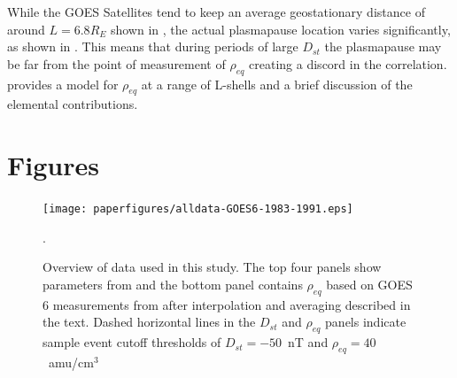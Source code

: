 \documentclass[10pt,twocolumn]{article}
\begin{document}
While the GOES Satellites tend to keep an average geostationary distance of around $L=6.8R_E$ shown in \cite{Takahashi2010}, the actual plasmapause location varies significantly, as shown in \cite{OBrien2003}. This means that during periods of large $D_{st}$ the plasmapause may be far from the point of measurement of $\rho_{eq}$ creating a discord in the correlation. \cite{Gallagher2000} provides a model for $\rho_{eq}$ at a range of L-shells and a brief discussion of the elemental contributions.

\newpage
\footnotesize



\clearpage
\section{Figures}

\begin{figure}[htp!]
\centering
\texttt{[image: paperfigures/alldata-GOES6-1983-1991.eps]}
\caption{Overview of data used in this study. The top four panels show parameters from \cite{Kondrashov2014ReconstructionOfGaps} and the bottom panel contains $\rho_{eq}$ based on GOES 6 measurements from \cite{Denton} after interpolation and averaging described in the text. Dashed horizontal lines in the $D_{st}$ and $\rho_{eq}$ panels indicate sample event cutoff thresholds of $D_{st} = -50$~nT and $\rho_{eq} = 40$~amu/cm$^3$}.
\label{AllData}
\end{figure}
\end{document}
